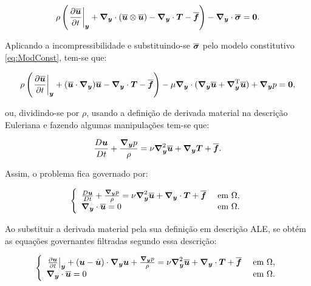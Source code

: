 \begin{equation}
    \rho\bigpar{\dTime{\BBB{u}}+\Ny\cdot(\BBB{u}\otimes\BBB{u})-\Ny\cdot\BB{T}-\BBB{f}}-\Ny\cdot\bar{\tens}=\BB{0}\text{.}
\end{equation}

Aplicando a incompressibilidade e substituindo-se $\bar{\tens}$ pelo modelo constitutivo \eqref{eq:ModConst}, tem-se que:

\begin{equation}
    \rho\bigpar{\dTime{\BBB{u}}+(\BBB{u}\cdot\Ny)\BBB{u}-\Ny\cdot\BB{T}-\BBB{f}}-\mu\Ny\cdot(\Ny\BBB{u}+\NyT\BBB{u})+\Ny p=\BB{0}\text{,}\label{eq:ConMasLES}
\end{equation}

\noindent ou, dividindo-se por $\rho$, usando a definição de derivada material na descrição Euleriana e fazendo algumas manipulações tem-se que:

\begin{equation}
    \frac{D\BB{u}}{Dt}+\frac{\Ny p}{\rho}=\nu\Lapl\BBB{u}+\Ny\BB{T}+\BBB{f}\text{.}
\end{equation}


Assim, o problema fica governado por:

\begin{equation}
    \left\{
    \begin{array}{ll}
        \frac{D\BB{u}}{Dt}+\frac{\Ny p}{\rho}=\nu\Lapl\BBB{u}+\Ny\cdot\BB{T}+\BBB{f} & \text{ em }\Omega\text{,} \\
        \Ny\cdot\BBB{u}=0                                                            & \text{ em }\Omega\text{.}
    \end{array}
    \right.
\end{equation}

Ao substituir a derivada material pela sua definição em descrição ALE, se obtém as equações governantes filtradas segundo essa descrição:

\begin{equation}
    \left\{
    \begin{array}{ll}
        \dTime{\BB{u}}+(\BB{u}-\uhat)\cdot\Ny\BB{u}+\frac{\Ny p}{\rho}=\nu\Lapl\BBB{u}+\Ny\cdot\BB{T}+\BBB{f} & \text{ em }\Omega\text{,} \\
        \Ny\cdot\BBB{u}=0                                                                                     & \text{ em }\Omega\text{.}
    \end{array}
    \right.
\end{equation}

